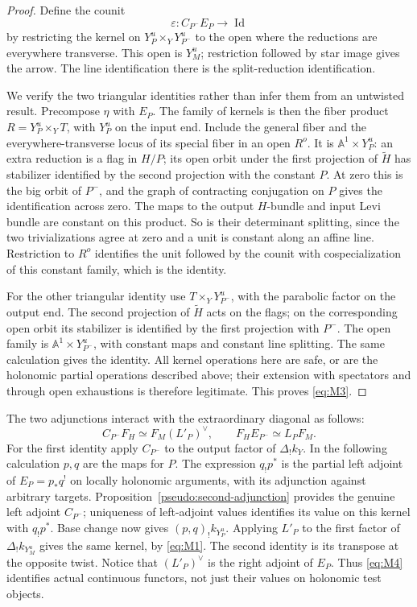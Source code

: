 \documentclass[11pt]{article}
\numberwithin{equation}{section}
\theoremstyle{definition}
\theoremstyle{remark}
\begin{document}
\begin{proof}
Define the counit
\[
 \varepsilon:C_{P^-}E_P\longrightarrow\operatorname{Id}
\]
by restricting the kernel on $Y_P^u\times_Y Y_{P^-}^u$ to the open where the
reductions are everywhere transverse.  This open is $Y_M^u$; restriction
followed by star image gives the arrow.  The line identification there is
the split-reduction identification.

We verify the two triangular identities rather than infer them from an
untwisted result.  Precompose $\eta$ with $E_P$.  The family of kernels is
then the fiber product $R=Y_P^u\times_YT$, with $Y_P^u$ on the input end.
Include the general fiber and the everywhere-transverse locus of its
special fiber in an open $R^o$.  It is $\mathbb A^1\times Y_P^u$: an extra
reduction is a flag in $H/P$; its open orbit under the first projection of
$\widetilde H$ has stabilizer identified by the second projection with the
constant $P$.  At zero this is the big orbit of $P^-$, and the graph of
contracting conjugation on $P$ gives the identification across zero.
The maps to the output $H$-bundle and input Levi bundle are constant on
this product.  So is their determinant splitting, since the two
trivializations agree at zero and a unit is constant along an affine line.
Restriction to $R^o$ identifies the unit followed by the counit with
cospecialization of this constant family, which is the identity.

For the other triangular identity use
$T\times_Y Y_{P^-}^u$, with the parabolic factor on the output end.  The
second projection of $\widetilde H$ acts on the flags; on the corresponding
open orbit its stabilizer is identified by the first projection with
$P^-$.  The open family is $\mathbb A^1\times Y_{P^-}^u$, with constant maps
and constant line splitting.  The same calculation gives the identity.
All kernel operations here are safe, or are the holonomic partial
operations described above; their extension with spectators and through
open exhaustions is therefore legitimate.  This proves \eqref{eq:M3}.
\end{proof}

The two adjunctions interact with the extraordinary diagonal as follows:
\begin{equation}\label{eq:M4}
 C_{P^-}F_H\simeq F_M(L'_P)^\vee,
 \qquad F_HE_{P^-}\simeq L_PF_M.
\end{equation}
For the first identity apply $C_{P^-}$ to the output factor of
$\Delta_!k_Y$.  In the following calculation $p,q$ are the maps for $P$.
The expression $q_!p^*$ is the partial left adjoint of $E_P=p_*q^!$
on locally holonomic arguments, with its adjunction against arbitrary
targets.  Proposition~\ref{pseudo:second-adjunction} provides the genuine
left adjoint $C_{P^-}$; uniqueness of left-adjoint values identifies its
value on this kernel with $q_!p^*$.  Base change now gives
$(p,q)_!k_{Y_P^u}$.  Applying $L'_P$ to the first factor of
$\Delta_!k_{Y_M^u}$ gives the same kernel, by \eqref{eq:M1}.
The second identity is its transpose at the opposite twist.  Notice that
$(L'_P)^\vee$ is the right adjoint of $E_P$.  Thus \eqref{eq:M4} identifies
actual continuous functors, not just their values on holonomic test objects.
\end{document}
